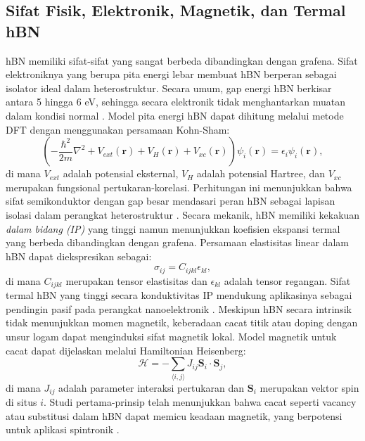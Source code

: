 \subsection{Sifat Fisik, Elektronik, Magnetik, dan Termal hBN}
hBN memiliki sifat-sifat yang sangat berbeda dibandingkan dengan grafena.
Sifat elektroniknya yang berupa pita energi lebar membuat hBN berperan sebagai isolator ideal dalam heterostruktur.
Secara umum, gap energi hBN berkisar antara 5 hingga 6 eV, sehingga secara elektronik tidak menghantarkan muatan dalam kondisi normal \citep{Zhang2020}.
Model pita energi hBN dapat dihitung melalui metode DFT dengan menggunakan persamaan Kohn-Sham:
\begin{equation}
    \left(-\frac{\hbar^2}{2m}\nabla^2 + V_{ext}(\mathbf{r}) + V_H(\mathbf{r}) + V_{xc}(\mathbf{r})\right)\psi_i(\mathbf{r}) = \epsilon_i \psi_i(\mathbf{r}),
\end{equation}
di mana \(V_{ext}\) adalah potensial eksternal, \(V_H\) adalah potensial Hartree, dan \(V_{xc}\) merupakan fungsional pertukaran-korelasi.
Perhitungan ini menunjukkan bahwa sifat semikonduktor dengan gap besar mendasari peran hBN sebagai lapisan isolasi dalam perangkat heterostruktur \citep{Zhang2020}.
Secara mekanik, hBN memiliki kekakuan \emph{dalam bidang (IP)} yang tinggi namun menunjukkan koefisien ekspansi termal yang berbeda dibandingkan dengan grafena.
Persamaan elastisitas linear dalam hBN dapat diekspresikan sebagai:
\begin{equation}
    \sigma_{ij} = C_{ijkl}\epsilon_{kl},
\end{equation}
di mana \(C_{ijkl}\) merupakan tensor elastisitas dan \(\epsilon_{kl}\) adalah tensor regangan.
Sifat termal hBN yang tinggi secara konduktivitas IP mendukung aplikasinya sebagai pendingin pasif pada perangkat nanoelektronik \citep{Zhang2020}.
Meskipun hBN secara intrinsik tidak menunjukkan momen magnetik, keberadaan cacat titik atau doping dengan unsur logam dapat menginduksi sifat magnetik lokal.
Model magnetik untuk cacat dapat dijelaskan melalui Hamiltonian Heisenberg:
\begin{equation}
    \mathcal{H} = -\sum_{\langle i,j \rangle} J_{ij} \mathbf{S}_i \cdot \mathbf{S}_j,
\end{equation}
di mana \(J_{ij}\) adalah parameter interaksi pertukaran dan \(\mathbf{S}_i\) merupakan vektor spin di situs \(i\).
Studi pertama-prinsip telah menunjukkan bahwa cacat seperti vacancy atau substitusi dalam hBN dapat memicu keadaan magnetik, yang berpotensi untuk aplikasi spintronik \citep{Zhang2020}.

